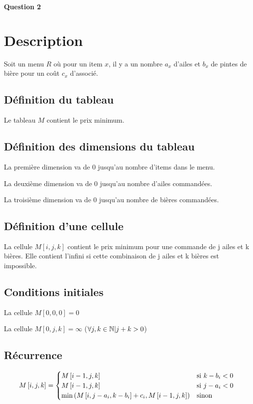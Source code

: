 \documentclass[class=article]{standalone}
\begin{document}
\centerline{\Huge \bf Question 2}
\bigskip

\section*{Description}

Soit un menu $R$ où pour un item $x$, il y a un nombre $a_x$ d'ailes 
et $b_x$ de pintes de bière pour un coût $c_x$ d'associé.

\subsection*{Définition du tableau}

Le tableau $M$ contient le prix minimum.

\subsection*{Définition des dimensions du tableau}

La première dimension va de 0 jusqu'au nombre d'items dans le menu.

La deuxième dimension va de 0 jusqu'au nombre d'ailes commandées.

La troisième dimension va de 0 jusqu'au nombre de bières commandées.

\subsection*{Définition d'une cellule}

La cellule $M[i,j,k]$ contient le prix minimum pour une commande de j ailes et k bières.
Elle contient l'infini si cette combinaison de j ailes et k bières est impossible.


\subsection*{Conditions initiales}

La cellule $M[0, 0, 0] = 0$

La cellule $M[0, j, k] = \infty$ ($\forall j, k \in \mathbb{N} | j + k > 0$)

\subsection*{Récurrence}

\[
    M\left [ i, j, k \right ] =
    \begin{cases}
        M\left [ i-1, j, k \right ] & \text{si } k-b_i < 0 \\
        M\left [ i-1, j, k \right ] & \text{si } j-a_i < 0 \\
        \min\left ( M\left [ i, j-a_i, k-b_i \right ] + c_i, M\left [ i-1, j, k \right ] \right ) & \text{sinon }
    \end{cases}
\]
\end{document}
